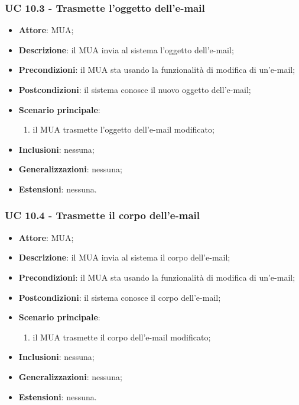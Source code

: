     \subsubsection{UC 10.3 - Trasmette l'oggetto dell'e-mail} \label{sec:UC10.3}
    \begin{itemize}
        \item \textbf{Attore}: MUA;
        \item \textbf{Descrizione}: il MUA invia al sistema l'oggetto dell'e-mail;
        \item \textbf{Precondizioni}: il MUA sta usando la funzionalità di modifica di un'e-mail;
        \item \textbf{Postcondizioni}: il sistema conosce il nuovo oggetto dell'e-mail;
        \item \textbf{Scenario principale}:
            \begin{enumerate}
                \item il MUA trasmette l'oggetto dell'e-mail modificato;
            \end{enumerate}
        \item \textbf{Inclusioni}: nessuna;
        \item \textbf{Generalizzazioni}: nessuna;
        \item \textbf{Estensioni}: nessuna.
    \end{itemize}

    \subsubsection{UC 10.4 - Trasmette il corpo dell'e-mail} \label{sec:UC10.4}
    \begin{itemize}
        \item \textbf{Attore}: MUA;
        \item \textbf{Descrizione}: il MUA invia al sistema il corpo dell'e-mail;
        \item \textbf{Precondizioni}: il MUA sta usando la funzionalità di modifica di un'e-mail;
        \item \textbf{Postcondizioni}: il sistema conosce il corpo dell'e-mail;
        \item \textbf{Scenario principale}:
            \begin{enumerate}
                \item il MUA trasmette il corpo dell'e-mail modificato;
            \end{enumerate}
        \item \textbf{Inclusioni}: nessuna;
        \item \textbf{Generalizzazioni}: nessuna;
        \item \textbf{Estensioni}: nessuna.
    \end{itemize}

